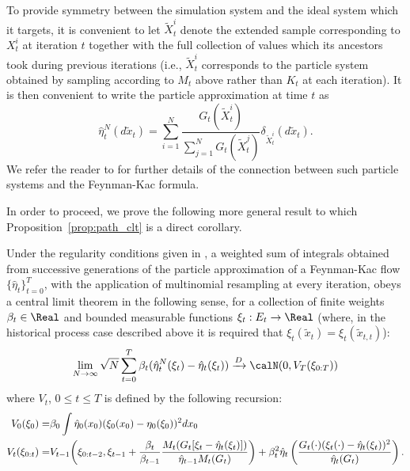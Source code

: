To provide symmetry between the simulation system and the ideal system which
it targets, it is convenient to let $\tilde{X}_t^i$ denote the extended
sample corresponding to $X_t^i$ at iteration $t$ together with the full
collection of values which its ancestors took during previous iterations
(i.e., $\tilde{X}_t^i$ corresponds to the particle system obtained by
sampling according to $M_t$ above rather than $K_t$ at each iteration). It is
then convenient to write the particle approximation at time $t$ as
\begin{equation*}
  \hat\eta_t^N(d\tilde{x}_t) = \sum_{i=1}^N
  \frac{G_t(\tilde{X}_t^i)}{\sum_{j=1}^N G_t(\tilde{X}_t^j)}
  \delta_{\tilde{X}_t^i}(d\tilde{x}_t).
\end{equation*}
We refer the reader to
\cite{DelMoral:2004ux} for further details of the connection between such
particle systems and the Feynman-Kac formula.

In order to proceed, we prove the following more general result to which
Proposition~\ref{prop:path_clt} is a direct corollary.

\begin{proposition}\label{prop:gen_clt}
  Under the regularity conditions given in \cite[section 9.4, pp.
  300--306]{DelMoral:2004ux}, a weighted sum of integrals obtained from
  successive generations of the particle approximation of a Feynman-Kac flow
  $\{\hat\eta_t\}_{t=0}^T$, with the application of multinomial resampling
  at every iteration, obeys a central limit theorem in the following sense,
  for a collection of finite weights $\beta_t\in\Real$ and bounded measurable
  functions $\xi_t:E_t \to\Real$ (where, in the historical process case
  described above it is required that $\xi_t(\tilde{x}_t) =
  \xi_t(\tilde{x}_{t,t})$):
  \begin{equation}
    \lim_{N\to\infty}\sqrt{N}
    \sum_{t=0}^T\beta_t(\hat\eta_t^N(\xi_t)-\hat\eta_t(\xi_t))
    \xrightarrow{D}\calN(0,V_T(\xi_{0:T}))
  \end{equation}
  where $V_t$, $0\le t \le T$ is defined by the following recursion:
  \begin{align}
    V_0(\xi_0) =& \beta_0 \int \hat\eta_0(x_0)(\xi_0(x_0) -
    \eta_0(\xi_0))^2 dx_0\notag\\
    V_t(\xi_{0:t}) =& V_{t-1}\biggl(\xi_{0:t-2}, \xi_{t-1}
    + \frac{\beta_t}{\beta_{t-1}}
    \frac{M_t(G_t[\xi_t-\hat\eta_t(\xi_t)])}{\hat\eta_{t-1}M_t(G_t)}\biggr)
    + \beta_t^2\hat\eta_t\left(\frac{G_t(\cdot) (\xi_t(\cdot)-\hat\eta_t(\xi_t))^2}{\hat\eta_t(G_t)}\right).
  \end{align}
\end{proposition}

